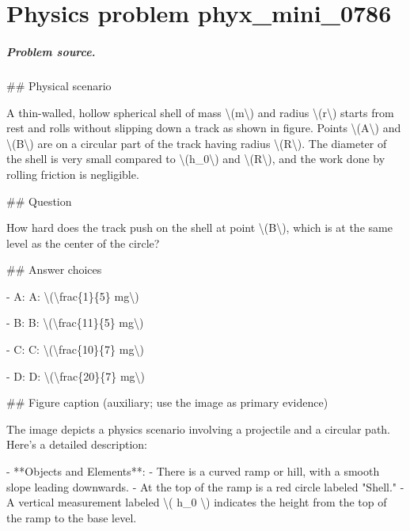 
\chapter{Physics problem phyx\_mini\_0786}
\label{ch:PhyXMiniProblems_problem_phyx_mini_0786}

\paragraph{Problem source.}
\#\# Physical scenario

A thin-walled, hollow spherical shell of mass \textbackslash{}(m\textbackslash{}) and radius \textbackslash{}(r\textbackslash{}) starts from rest and rolls without slipping down a track as shown in figure. Points \textbackslash{}(A\textbackslash{}) and \textbackslash{}(B\textbackslash{}) are on a circular part of the track having radius \textbackslash{}(R\textbackslash{}). The diameter of the shell is very small compared to \textbackslash{}(h\_0\textbackslash{}) and \textbackslash{}(R\textbackslash{}), and the work done by rolling friction is negligible.

\#\# Question

How hard does the track push on the shell at point \textbackslash{}(B\textbackslash{}), which is at the same level as the center of the circle?

\#\# Answer choices

- A: A: \textbackslash{}(\textbackslash{}frac\{1\}\{5\} mg\textbackslash{})

- B: B: \textbackslash{}(\textbackslash{}frac\{11\}\{5\} mg\textbackslash{})

- C: C: \textbackslash{}(\textbackslash{}frac\{10\}\{7\} mg\textbackslash{})

- D: D: \textbackslash{}(\textbackslash{}frac\{20\}\{7\} mg\textbackslash{})

\#\# Figure caption (auxiliary; use the image as primary evidence)

The image depicts a physics scenario involving a projectile and a circular path. Here's a detailed description:

- **Objects and Elements**:
  - There is a curved ramp or hill, with a smooth slope leading downwards.
  - At the top of the ramp is a red circle labeled "Shell."
  - A vertical measurement labeled \textbackslash{}( h\_0 \textbackslash{}) indicates the height from the top of the ramp to the base level.

